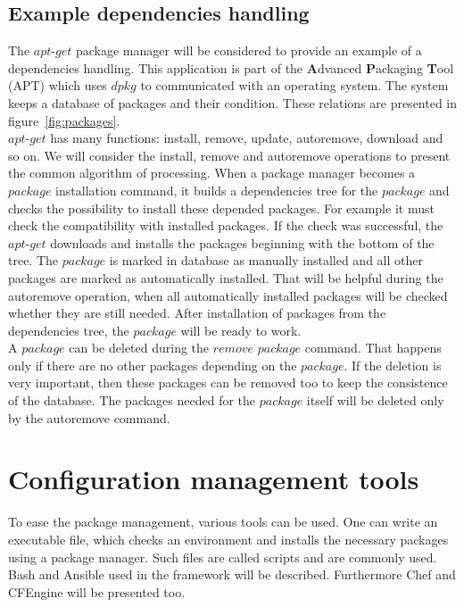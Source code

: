 \subsection*{Example dependencies handling}
The $apt$-$get$ package manager will be considered to provide an example of a dependencies handling.
This application is part of the \textbf{A}dvanced \textbf{P}ackaging \textbf{T}ool (APT) which uses $dpkg$ to communicated with an operating system.
The system keeps a database of packages and their condition.
These relations are presented in figure~\ref{fig:packages}.\\
$apt$-$get$ has many functions: install, remove, update, autoremove, download and so on.
We will consider the install, remove and autoremove operations to present the common algorithm of processing.
When a package manager becomes a $package$ installation command, it builds a dependencies tree for the $package$ and checks the possibility to install these depended packages.
For example it must check the compatibility with installed packages. 
If the check was successful, the $apt$-$get$ downloads and installs the packages beginning with the bottom of the tree.
The $package$ is marked in database as manually installed and all other packages are marked as automatically installed. 
That will be helpful during the autoremove operation, when all automatically installed packages will be checked whether they are still needed.
After installation of packages from the dependencies tree, the $package$ will be ready to work.\\
A $package$ can be deleted during the $remove$ $package$ command.
That happens only if there are no other packages depending on the $package$. 
If the deletion is very important, then these packages can be removed too to keep the consistence of the database. 
The packages needed for the $package$ itself will be deleted only by the autoremove command.



\section{Configuration management tools}
To ease the package management, various tools can be used. 
One can write an executable file, which checks an environment and installs the necessary packages using a package manager.
Such files are called scripts and are commonly used.
Bash and Ansible used in the framework will be described.
Furthermore Chef and CFEngine will be presented too.

